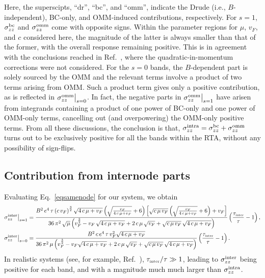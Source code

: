 \documentclass[aps,prb,onecolumn,nofootinbib,citeautoscript,10pt]{revtex4-2}
\def \nn{\nonumber \\}
\begin{document}
Here, the superscipts, ``dr'', ``bc'', and ``omm'', indicate the Drude (i.e., $B$-independent), BC-only, and OMM-induced contributions, respectively. For $s=1$, $\sigma_{zz}^{\rm bc} $ and $\sigma_{zz}^{\rm omm}$ come with opposite signs. Within the parameter regions for $\mu$, $v_F$, and $c$ considered here, the magnitude of the latter is always smaller than that of the former, with the overall response remaining positive. This is in agreement with the conclusions reached in Ref.~\cite{ips-spin1-ph}, where the quadratic-in-momentum corrections were not considered. For the $s=0$ bands, the $B$-dependent part is solely sourced by the OMM and the relevant terms involve a product of two terms arising from OMM. Such a product term gives only a positive contribution, as is reflected in $\sigma_{zz}^{\rm omm} \big \vert_{s=0} $. In fact, the negative parts in $\sigma_{zz}^{\rm omm} \big \vert_{s=1}$ have arisen from integrands containing a product of one power of BC-only and one power of OMM-only terms, cancelling out (and overpowering) the OMM-only positive terms. From all these discussions, the conclusion is that, $  \sigma_{zz}^{\rm intra} = \sigma_{zz}^{\rm bc} + \sigma_{zz}^{\rm omm} $ turns out to be exclusively positive for all the bands within the RTA, without any possibility of sign-flips.


\subsection{Contribution from internode parts}


Evaluating Eq.~\eqref{eqsamenode} for our system, we obtain
\begin{align}
 \sigma_{zz}^{\rm inter} \big \vert_{s=1} & =
\frac{ B^2 \, e^4 \, \tau  \left(c \,  v_F\right)^{\frac{3} {2} }
 \sqrt{4 \,c \,\mu + v_F}
  \left(\sqrt{\frac{v_F} {4 \, c \,\mu +v_F}}+6\right) 
  \left [ \sqrt{c\, \mu \, v_F}
   \left ( \sqrt{\frac{v_F}{4 \, c\, \mu +v_F}}+6\right) + v_F\right ]  
 } 
 {36 \, \pi ^2\,\sqrt \mu 
 \left(  v_F^{\frac{3} {2} } - v_F \, \sqrt{4 \, c \, \mu + v_F}
  + 2 \, c \, \mu\, \sqrt{v_F} + \sqrt{c \,\mu\, v_F} 
  \, \sqrt{4 \, c \, \mu + v_F} \right)}
 \left(\frac{ \tau_{\text{\tiny{inter}}} }{\tau }-1\right)  ,\nn
 \sigma_{zz}^{\rm inter} \big \vert_{s=0} & =
 \frac{B^2 \,c\, e^4 \, \tau \, v_F^2 
 \sqrt{ 4\, c \, \mu  +v_F}}{36 \, \pi ^2 \, \mu 
  \left( v_F^{\frac{3} {2} } -v_F \sqrt{ 4\, c \, \mu  +v_F} 
  + 2 \, c  \, \mu \,  \sqrt{v_F}
  +\sqrt{c \,\mu \, v_F} \,\sqrt{ 4\, c \, \mu  +v_F}
  \right)}
 \left(\frac{ \tau_{\text{\tiny{inter}}} }{\tau }-1\right) .
\end{align} 
In realistic systems (see, for example, Ref.~\cite{claudia-multifold}), $ { \tau_{\text{\tiny{inter}}} }/{\tau }  \gg 1$, leading to
$\sigma_{zz}^{\rm inter}$ being positive for each band, and with a magnitude much much larger than $\sigma_{zz}^{\rm intra}$.
\end{document}
